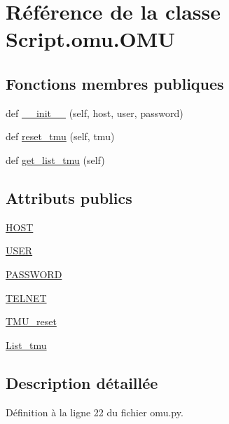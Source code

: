 \hypertarget{classScript_1_1omu_1_1OMU}{}\section{Référence de la classe Script.\+omu.\+O\+MU}
\label{classScript_1_1omu_1_1OMU}
\subsection*{Fonctions membres publiques}
\begin{DoxyCompactItemize}
\item 
def \hyperlink{classScript_1_1omu_1_1OMU_a1be569a13c8e86722862b330c90c4091}{\+\_\+\+\_\+init\+\_\+\+\_\+} (self, host, user, password)
\item 
def \hyperlink{classScript_1_1omu_1_1OMU_a563cfa14e4947945a078589e9fdde9ed}{reset\+\_\+tmu} (self, tmu)
\item 
def \hyperlink{classScript_1_1omu_1_1OMU_a1c92aa9df1f555d88f49669556a7ef09}{get\+\_\+list\+\_\+tmu} (self)
\end{DoxyCompactItemize}
\subsection*{Attributs publics}
\begin{DoxyCompactItemize}
\item 
\hyperlink{classScript_1_1omu_1_1OMU_a7ab79fab99cb1987d8826b5a715c61e5}{H\+O\+ST}
\item 
\hyperlink{classScript_1_1omu_1_1OMU_a2b281abf15a86f56b9d55b66513010be}{U\+S\+ER}
\item 
\hyperlink{classScript_1_1omu_1_1OMU_aa145f703e4bb94ab36c2f897a52488c7}{P\+A\+S\+S\+W\+O\+RD}
\item 
\hyperlink{classScript_1_1omu_1_1OMU_a92d77c41b840c87086283e2efed82f59}{T\+E\+L\+N\+ET}
\item 
\hyperlink{classScript_1_1omu_1_1OMU_ae52d30b3793b007ea99cef0877d9bcf4}{T\+M\+U\+\_\+reset}
\item 
\hyperlink{classScript_1_1omu_1_1OMU_a56dd70ac0ae8683e51629cc22b6dddfc}{List\+\_\+tmu}
\end{DoxyCompactItemize}


\subsection{Description détaillée}


Définition à la ligne 22 du fichier omu.\+py.



